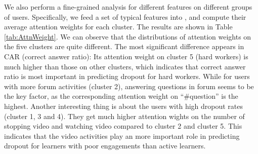  	 We also perform a fine-grained analysis for different features on different groups of users. Specifically, we feed a set of typical features into \modelname{}, and compute their average attention weights for each cluster. The results are shown in Table \ref{tab:AttnWeight}. We can observe that the distributions of attention weights on the five clusters are quite different. The most significant difference appears in CAR (correct answer ratio): Its attention weight on cluster 5 (hard workers) is much higher than those on other clusters, which indicates that correct answer ratio is most important in predicting dropout for hard workers. While for users with more forum activities (cluster 2), answering questions in forum seems to be the key factor, as the corresponding attention weight on ``\#question'' is the highest. Another interesting thing is about the users with high dropout rates (cluster 1, 3 and 4). They get much higher attention wights on the number of stopping video and watching video compared to cluster 2 and cluster 5. This indicates that the video activities play an more important role in predicting dropout for learners with poor engagements than active learners.
 	 

